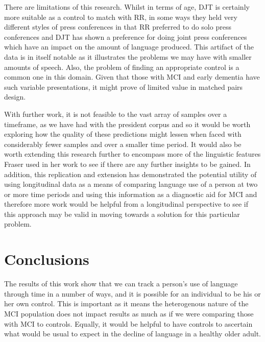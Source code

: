 \documentclass[12pt]{article}
\begin{document}
There are limitations of this research. Whilst in terms of age, DJT is certainly more suitable as a control to match with RR, in some ways they held very different styles of press conferences in that RR preferred to do solo press conferences and DJT has shown a preference for doing joint press conferences which have an impact on the amount of language produced. This artifact of the data is in itself notable as it illustrates the problems we may have with smaller amounts of speech. Also, the problem of finding an appropriate control is a common one in this domain. Given that those with MCI and early dementia have such variable presentations, it might prove of limited value in matched pairs design. 
\par 
With further work, it is not feasible to the vast array of samples over a timeframe, as we have had with the president corpus and so it would be worth exploring how the quality of these predictions might lessen when faced with considerably fewer samples and over a smaller time period. It would also be worth extending this research further to encompass more of the linguistic features Fraser used in her work \cite{Fraser2015} to see if there are any further insights to be gained. In addition, this replication and extension has demonstrated the potential utility of using longitudinal data as a means of comparing language use of a person at two or more time periods and using this information as a diagnostic aid for MCI and therefore more work would be helpful from a longitudinal perspective to see if this approach may be valid in moving towards a solution for this particular problem. 

\section{Conclusions}\label{conclusions}
The results of this work show that we can track a person's use of language through time in a number of ways, and it is possible for an individual to be his or her own control. This is important as it means the heterogenous nature of the MCI population does not impact results as much as if we were comparing those with MCI to controls. Equally, it would be helpful to have controls to ascertain what would be usual to expect in the decline of language in a healthy older adult. 



\end{document}
